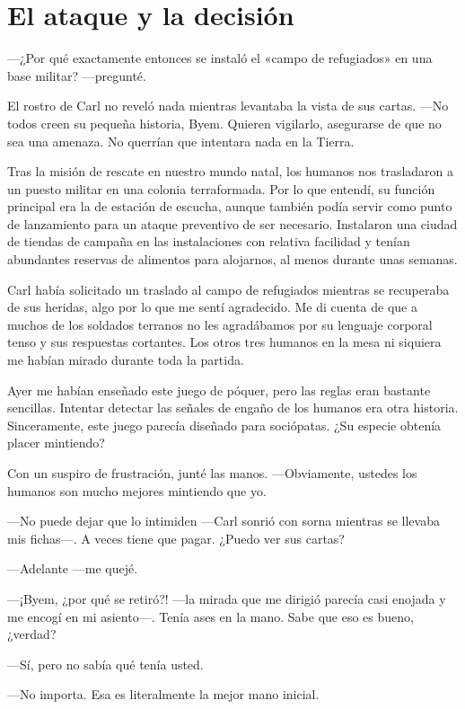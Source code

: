 \chapter{El ataque y la decisión}\label{sec:el-attacke-y-la-decision}

 —¿Por qué exactamente entonces se instaló el «campo de refugiados» en una base militar? —pregunté.

El rostro de Carl no reveló nada mientras levantaba la vista de sus cartas. —No todos creen su pequeña historia, Byem. Quieren vigilarlo, asegurarse de que no sea una amenaza. No querrían que intentara nada en la Tierra.

Tras la misión de rescate en nuestro mundo natal, los humanos nos trasladaron a un puesto militar en una colonia terraformada. Por lo que entendí, su función principal era la de estación de escucha, aunque también podía servir como punto de lanzamiento para un ataque preventivo de ser necesario. Instalaron una ciudad de tiendas de campaña en las instalaciones con relativa facilidad y tenían abundantes reservas de alimentos para alojarnos, al menos durante unas semanas.

Carl había solicitado un traslado al campo de refugiados mientras se recuperaba de sus heridas, algo por lo que me sentí agradecido. Me di cuenta de que a muchos de los soldados terranos no les agradábamos por su lenguaje corporal tenso y sus respuestas cortantes. Los otros tres humanos en la mesa ni siquiera me habían mirado durante toda la partida.

Ayer me habían enseñado este juego de póquer, pero las reglas eran bastante sencillas. Intentar detectar las señales de engaño de los humanos era otra historia. Sinceramente, este juego parecía diseñado para sociópatas. ¿Su especie obtenía placer mintiendo?

Con un suspiro de frustración, junté las manos. —Obviamente, ustedes los humanos son mucho mejores mintiendo que yo.

—No puede dejar que lo intimiden —Carl sonrió con sorna mientras se llevaba mis fichas—. A veces tiene que pagar. ¿Puedo ver sus cartas?

—Adelante —me quejé.

—¡Byem, ¿por qué se retiró?! —la mirada que me dirigió parecía casi enojada y me encogí en mi asiento—. Tenía ases en la mano. Sabe que eso es bueno, ¿verdad?

—Sí, pero no sabía qué tenía usted.

—No importa. Esa es literalmente la mejor mano inicial.

